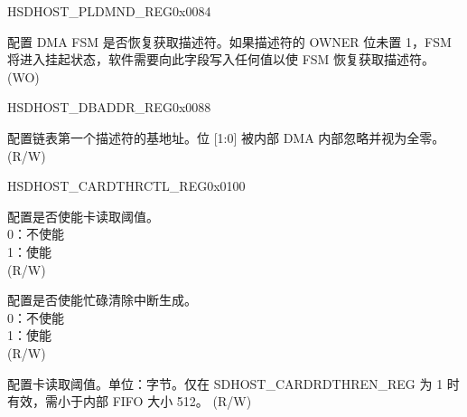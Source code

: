 \begin{register}{H}{SDHOST\_PLDMND\_REG}{0x0084}\label{regdesc:SDHOSTPLDMNDREG}
%
\regnewline%
\begin{regdesc}\begin{reglist}
\label{fielddesc:SDHOSTPLDMNDPD}\item [SDHOST\_PLDMND\_PD] 配置 DMA FSM 是否恢复获取描述符。如果描述符的 OWNER 位未置 1，FSM 将进入挂起状态，软件需要向此字段写入任何值以使 FSM 恢复获取描述符。 (WO)
\end{reglist}\end{regdesc}
\end{register}


\begin{register}{H}{SDHOST\_DBADDR\_REG}{0x0088}\label{regdesc:SDHOSTDBADDRREG}
%
\regnewline%
\begin{regdesc}\begin{reglist}
\label{fielddesc:SDHOSTDBADDRREG}\item [SDHOST\_DBADDR\_REG] 配置链表第一个描述符的基地址。位 [1:0] 被内部 DMA 内部忽略并视为全零。  (R/W)
\end{reglist}\end{regdesc}
\end{register}


\begin{register}{H}{SDHOST\_CARDTHRCTL\_REG}{0x0100}\label{regdesc:SDHOSTCARDTHRCTLREG}
%
%
%
%
\regnewline%
\begin{regdesc}\begin{reglist}
\label{fielddesc:SDHOSTCARDRDTHRENREG}\item [SDHOST\_CARDRDTHREN\_REG] 配置是否使能卡读取阈值。\\
0：不使能\\
1：使能\\ (R/W)
\label{fielddesc:SDHOSTCARDCLRINTENREG}\item [SDHOST\_CARDCLRINTEN\_REG] 配置是否使能忙碌清除中断生成。\\
0：不使能\\
1：使能\\ (R/W)
\label{fielddesc:SDHOSTCARDTHRESHOLDREG}\item [SDHOST\_CARDTHRESHOLD\_REG] 配置卡读取阈值。单位：字节。仅在 SDHOST\_CARDRDTHREN\_REG 为 1 时有效，需小于内部 FIFO 大小 512。  (R/W)
\end{reglist}\end{regdesc}
\end{register}


